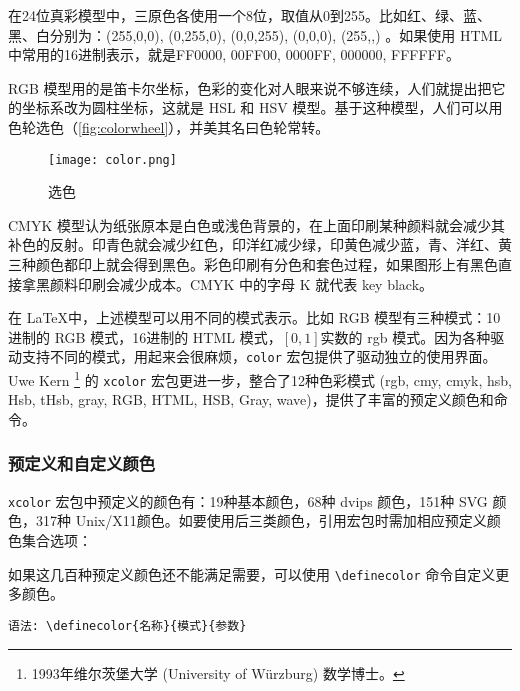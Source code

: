 在24位真彩模型中，三原色各使用一个8位，取值从0到255。比如红、绿、蓝、黑、白分别为：(255,0,0), (0,255,0), (0,0,255), (0,0,0), (255,,) 。如果使用 HTML 中常用的16进制表示，就是FF0000, 00FF00, 0000FF, 000000, FFFFFF。

RGB 模型用的是笛卡尔坐标，色彩的变化对人眼来说不够连续，人们就提出把它的坐标系改为圆柱坐标，这就是 HSL 和 HSV 模型。基于这种模型，人们可以用色轮选色（\autoref{fig:colorwheel}），并美其名曰色轮常转。

\begin{figure}[htbp]
\centering
\texttt{[image: color.png]}
\caption{选色}
\label{fig:colorwheel}
\end{figure}

CMYK 模型认为纸张原本是白色或浅色背景的，在上面印刷某种颜料就会减少其补色的反射。印青色就会减少红色，印洋红减少绿，印黄色减少蓝，青、洋红、黄三种颜色都印上就会得到黑色。彩色印刷有分色和套色过程，如果图形上有黑色直接拿黑颜料印刷会减少成本。CMYK 中的字母 K 就代表 key black。

在 \LaTeX 中，上述模型可以用不同的模式表示。比如 RGB 模型有三种模式：10进制的 RGB 模式，16进制的 HTML 模式，$[0,1]$实数的 rgb 模式。因为各种驱动支持不同的模式，用起来会很麻烦，\texttt{color} 宏包提供了驱动独立的使用界面。Uwe Kern\indexKern{} \footnote{1993年维尔茨堡大学 (University of Würzburg) 数学博士。} 的 \texttt{xcolor} 宏包更进一步，整合了12种色彩模式 (rgb, cmy, cmyk, hsb, Hsb, tHsb, gray, RGB, HTML, HSB, Gray, wave)，提供了丰富的预定义颜色和命令。

\subsubsection{预定义和自定义颜色}

\texttt{xcolor} 宏包中预定义的颜色有：19种基本颜色，68种 dvips 颜色，151种 SVG 颜色，317种 Unix/X11颜色。如要使用后三类颜色，引用宏包时需加相应预定义颜色集合选项：

\begin{Code}[]
\usepackage[dvipsnames]{xcolor}
\usepackage[svgnames]{xcolor}
\usepackage[x11names]{xcolor}
\end{Code}

如果这几百种预定义颜色还不能满足需要，可以使用 \verb|\definecolor| 命令自定义更多颜色。

\verb|语法: \definecolor{名称}{模式}{参数}|

\begin{example}[h]
\begin{Code}[]
\end{Code}
\caption{自定义颜色}
\label{exa:definecolor}
\end{example}

